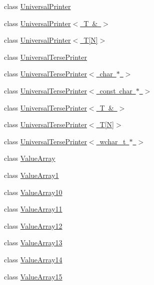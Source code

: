 \begin{DoxyCompactItemize}
\item 
class \mbox{\hyperlink{classtesting_1_1internal_1_1_universal_printer}{Universal\+Printer}}
\item 
class \mbox{\hyperlink{classtesting_1_1internal_1_1_universal_printer_3_01_t_01_6_01_4}{Universal\+Printer$<$ T \& $>$}}
\item 
class \mbox{\hyperlink{classtesting_1_1internal_1_1_universal_printer_3_01_t[_n]_4}{Universal\+Printer$<$ T\mbox{[}\+N\mbox{]}$>$}}
\item 
class \mbox{\hyperlink{classtesting_1_1internal_1_1_universal_terse_printer}{Universal\+Terse\+Printer}}
\item 
class \mbox{\hyperlink{classtesting_1_1internal_1_1_universal_terse_printer_3_01char_01_5_01_4}{Universal\+Terse\+Printer$<$ char $\ast$ $>$}}
\item 
class \mbox{\hyperlink{classtesting_1_1internal_1_1_universal_terse_printer_3_01const_01char_01_5_01_4}{Universal\+Terse\+Printer$<$ const char $\ast$ $>$}}
\item 
class \mbox{\hyperlink{classtesting_1_1internal_1_1_universal_terse_printer_3_01_t_01_6_01_4}{Universal\+Terse\+Printer$<$ T \& $>$}}
\item 
class \mbox{\hyperlink{classtesting_1_1internal_1_1_universal_terse_printer_3_01_t[_n]_4}{Universal\+Terse\+Printer$<$ T\mbox{[}\+N\mbox{]}$>$}}
\item 
class \mbox{\hyperlink{classtesting_1_1internal_1_1_universal_terse_printer_3_01wchar__t_01_5_01_4}{Universal\+Terse\+Printer$<$ wchar\+\_\+t $\ast$ $>$}}
\item 
class \mbox{\hyperlink{classtesting_1_1internal_1_1_value_array}{Value\+Array}}
\item 
class \mbox{\hyperlink{classtesting_1_1internal_1_1_value_array1}{Value\+Array1}}
\item 
class \mbox{\hyperlink{classtesting_1_1internal_1_1_value_array10}{Value\+Array10}}
\item 
class \mbox{\hyperlink{classtesting_1_1internal_1_1_value_array11}{Value\+Array11}}
\item 
class \mbox{\hyperlink{classtesting_1_1internal_1_1_value_array12}{Value\+Array12}}
\item 
class \mbox{\hyperlink{classtesting_1_1internal_1_1_value_array13}{Value\+Array13}}
\item 
class \mbox{\hyperlink{classtesting_1_1internal_1_1_value_array14}{Value\+Array14}}
\item 
class \mbox{\hyperlink{classtesting_1_1internal_1_1_value_array15}{Value\+Array15}}

\end{DoxyCompactItemize}
